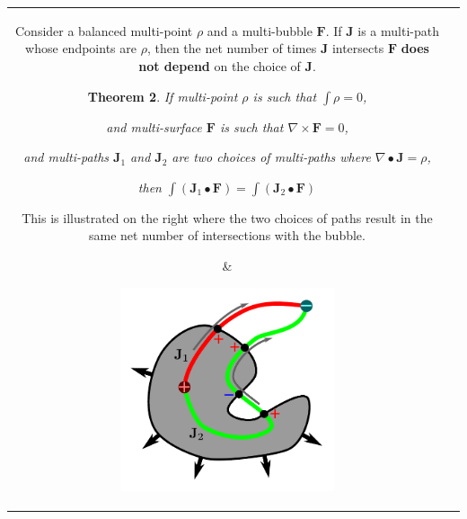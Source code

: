\documentclass{book}
\newtheorem{thm}{Theorem}
\begin{document}
\begin{tabular}{cc}
\parbox{0.5\textwidth}{
Consider a balanced multi-point \(\rho\) and a multi-bubble \(\mathbf{F}\). If \(\mathbf{J}\) is a multi-path whose endpoints are \(\rho\), then the net number of times \(\mathbf{J}\) intersects \(\mathbf{F}\) {\bf does not depend} on the choice of \(\mathbf{J}\). 

\begin{thm}
If multi-point \(\rho\) is such that \(\int \rho = 0\), 

and multi-surface \(\mathbf{F}\) is such that \(\nabla \times \mathbf{F} = 0\), 

and multi-paths \(\mathbf{J}_1\) and \(\mathbf{J}_2\) are two choices  
of multi-paths where \(\nabla \bullet \mathbf{J} = \rho\), 

then \(\int (\mathbf{J}_1 \bullet \mathbf{F}) = \int (\mathbf{J}_2 \bullet \mathbf{F})\)
\end{thm}

This is illustrated on the right where the two choices of paths result in the same net number of intersections with the bubble.
} & \parbox{0.5\textwidth}{
\includegraphics[width = 0.5\textwidth]{Intersections/Path-surface_intersections/closed_surface_and_different_paths}
}
\end{tabular}
\end{document}
